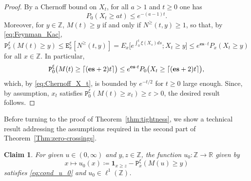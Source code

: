 \documentclass[12pt,reqno,oneside]{amsart}
\numberwithin{equation}{section}
\newtheorem{claim}[theorem]{Claim}
\theoremstyle{definition}
\theoremstyle{remark}
\newcommand{\R}{\mathbb{R}}
\newcommand{\Z}{\mathbb{Z}}
\newcommand{\es}{\mathbf{es}}
\newcommand{\bbone}{\boldsymbol 1}
\DeclarePairedDelimiter{\ceil}{\lceil}{\rceil}
\begin{document}
\begin{proof}[Proof]
  By a Chernoff bound on $X_t$, for all $a>1$ and $t \geq 0$ one has
  \begin{equation}\label{eq:Chernoff_X_t}
      P_0(X_t \geq at) \leq e^{-(a-1)t}.
  \end{equation}
  Moreover, for $y \in \Z$, $M(t) \geq y$ if
  and only if $N^\geq(t,y) \geq 1$, so that, by \eqref{eq:Feynman_Kac},
  \begin{equation}\label{eq:bound_N^geq}
    \mathtt{P}_{x}^\xi(M(t)\geq y) \leq \mathtt{E}_{x}^\xi[N^{\geq}(t,y)]
    = E_{x}\Big[ e^{\int_0^t \xi(X_s)ds}; X_t \geq y\Big]\leq e^{\es \cdot
      t}P_{x}(X_t \geq y)
  \end{equation}
  for all $x \in \Z$. In particular,
  \begin{equation}
    \label{eq:max_bound}
    \mathtt{P}^{\xi}_0\big(M(t) \geq \ceil{(\es+2)t}\big)
    \leq e^{\es\cdot t} P_0\big(X_t \geq \ceil{(\es+2)t}\big),
  \end{equation}
  which, by \eqref{eq:Chernoff_X_t}, is bounded by $e^{-t/2}$ for $t\geq 0$ large enough. Since, by assumption, $x_t$ satisfies
  $\mathtt{P}^\xi_0(M(t) \geq x_t) \geq \varepsilon >0$,
  the desired result follows.
\end{proof}

Before turning to the proof of Theorem~\ref{thm:tightness}, we show a
technical result addressing the assumptions required in the second part of
Theorem~\ref{Thm:zero-crossings}.

\begin{claim}
  \label{claim:u_0}
  For given $u\in(0,\infty)$ and $y,z \in \Z$, the function $u_0:\Z \rightarrow \R$ given by
  \begin{equation*}
    x \mapsto u_0(x)\coloneq\bbone_{x \geq z}
    - \mathtt{P}^\xi_x(M(u) \geq y)
  \end{equation*}
  satisfies \eqref{eq:cond_u_0} and $u_0\in \ell^1(\Z)$.
\end{claim}
\end{document}
